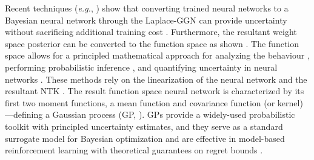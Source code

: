 \documentclass{article}
\makeatletter
\newcommand{\eg}{\textit{e.g.\@}\xspace}
\makeatother
\begin{document}
Recent techniques (\eg, \cite{ritter2018kfac,khan2019approximate,daxberger2021laplace,fortuin2021bayesian,immer2021scalable}) show that converting trained neural networks to a Bayesian neural network through the Laplace-GGN can provide uncertainty without sacrificing additional training cost \cite{foong2019between}. Furthermore, the resultant weight space posterior can be converted to the function space as shown \cite{khan2019approximate, immer2021improving}. The function space allows for a principled mathematical approach for analyzing the behaviour \cite{cho2009kernel,meronen2020stationary}, performing probabilistic inference \cite{khan2019approximate}, and quantifying uncertainty in neural networks \cite{foong2019between}. These methods rely on the linearization of the neural network and the resultant NTK \cite{jacot2018neural}. The result function space neural network is characterized by its first two moment functions, a mean function and covariance function (or kernel)---defining a Gaussian process (GP, \cite{rasmussen2006gaussian}). GPs provide a widely-used probabilistic toolkit with principled uncertainty estimates, and they serve as a standard surrogate model for Bayesian optimization \citep{garnett_bayesoptbook_2022} and are effective in model-based reinforcement learning \citep{deisenroth2011pilco} with theoretical guarantees on regret bounds \citep{srinivas2009gaussian}. 
\end{document}
